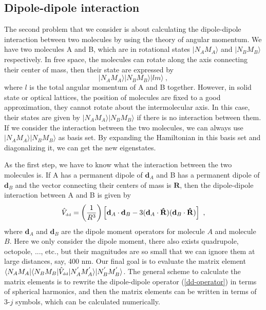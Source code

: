 \subsection{Dipole-dipole interaction}
\label{sec::ddInteraction}

The second problem that we consider is about calculating the dipole-dipole interaction between two molecules by using the theory of angular momentum. 
We have two molecules A and B, which are in rotational states $|N_{A}M_{A}\rangle$ and $|N_{B}M_{B}\rangle$ 
respectively. In free space, the molecules can rotate along the axis connecting their center of mass, then their state 
are expressed by
\begin{equation}
|N_{A}M_{A}\rangle |N_{B}M_{B}\rangle |lm\rangle  \ , \nonumber
\end{equation}
where $l$ is the total angular momentum of A and B together. 
However, in solid state or optical lattices, the position of molecules are fixed to a good approximation, they cannot rotate about the intermolecular axis. In this case, their states are given by $|N_{A}M_{A}\rangle |N_{B}M_{B}\rangle$ if there is no interaction between them. If we consider the interaction between the two molecules, we can always use $|N_{A}M_{A}\rangle |N_{B}M_{B}\rangle$ as basis set. By expanding the Hamiltonian in this basis set and diagonalizing it, we can get the new eigenstates.

As the first step, we have to know what the interaction between the two molecules is. If A has a permanent dipole of $\mathbf{d}_{A}$ and B has a permanent dipole of $\mathbf{d}_{B}$ and the vector connecting their centers of mass is $\mathbf{R}$, then the dipole-dipole interaction between A and B is given by
\begin{equation}
\hat{V}_{\mbox{\tiny dd}} = \left(\frac{1}{R^3}\right)\left[ \mathbf{d}_{A}\cdot\mathbf{d}_{B}-3(\mathbf{d}_{A}\cdot\mathbf{\hat{R}})(\mathbf{d}_{B}\cdot\mathbf{\hat{R}})\right]  \ , \label{dd-operator}
\end{equation}
where $\mathbf{d}_{A}$ and $\mathbf{d}_{B}$ are the dipole moment operators for molecule $A$ and molecule 
$B$. 
Here we only consider the dipole moment, there also exists quadrupole, octopole, ..., etc., but their magnitudes are so small that we can ignore them at large distances, say, 400 nm. Our final goal is to evaluate the matrix element $\langle N_{A}M_{A}|\langle N_{B}M_{B} | \hat{V}_{\mbox{\tiny dd}}|N_{A}^{'}M_{A}^{'}\rangle |N_{B}^{'}M_{B}^{'}      \rangle$. The general scheme to calculate the matrix elements is to rewrite the dipole-dipole operator (\autoref{dd-operator}) in terms of spherical harmonics, and then the matrix elements can be written in terms of 3-$j$ symbols, which can be calculated numerically. 

